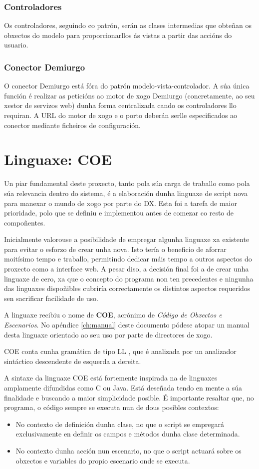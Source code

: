 \subsubsection{Controladores}
Os controladores, seguindo co patrón, serán as clases intermedias que obteñan
os obxectos do modelo para proporcionarllos ás vistas a partir das accións do
usuario.

\subsubsection{Conector Demiurgo}
O conector Demiurgo está fóra do patrón modelo-vista-controlador. A súa única
función é realizar as peticións ao motor de xogo Demiurgo (concretamente, ao
seu xestor de servizos web) dunha forma centralizada cando os controladores llo
requiran. A URL do motor de xogo e o porto deberán serlle especificados ao
conector mediante ficheiros de configuración.

\section{Linguaxe: COE}
Un piar fundamental deste proxecto, tanto pola súa carga de traballo como pola
súa relevancia dentro do sistema, é a elaboración dunha linguaxe de script nova
para manexar o mundo de xogo por parte do DX. Esta foi a tarefa de maior
prioridade, polo que se definiu e implementou antes de comezar co resto de
compoñentes.
\par
Inicialmente valorouse a posibilidade de empregar algunha linguaxe xa existente
para evitar o esforzo de crear unha nova. Isto tería o beneficio de aforrar
moitísimo tempo e traballo, permitindo dedicar máis tempo a outros aspectos do
proxecto como a interface web. A pesar diso, a decisión final foi a de crear
unha linguaxe de cero, xa que o concepto do programa non ten precedentes e
ningunha das linguaxes dispoñibles cubriría correctamente os distintos aspectos
requeridos sen sacrificar facilidade de uso.
\par
A linguaxe recibiu o nome de \textbf{COE}, acrónimo de \textit{Código de
Obxectos e Escenarios}. No apéndice \ref{ch:manual} deste documento pódese
atopar un manual desta linguaxe orientado ao seu uso por parte de directores de
xogo.
\par
COE conta cunha gramática de tipo LL \cite{compiladores}, que é analizada por un
analizador sintáctico descendente de esquerda a dereita.
\par
A sintaxe da linguaxe COE está fortemente inspirada na de linguaxes amplamente
difundidas como C ou Java. Está deseñada tendo en mente a súa finalidade e
buscando a maior simplicidade posible. É importante resaltar que, no programa,
o código sempre se executa nun de dous posibles contextos:
\begin{itemize}
  \item No contexto de definición dunha clase, no que o script se empregará
  exclusivamente en definir os campos e métodos dunha clase determinada.
  \item No contexto dunha acción nun escenario, no que o script actuará sobre os
  obxectos e variables do propio escenario onde se executa.
\end{itemize}

